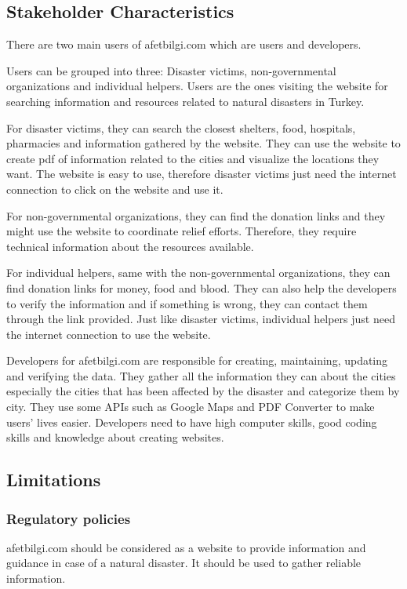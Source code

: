 \documentclass[12pt]{report}
\begin{document}
\subsection{Stakeholder Characteristics}
There are two main users of afetbilgi.com which are users and developers.

Users can be grouped into three: Disaster victims, non-governmental organizations and individual helpers. Users are the ones visiting the website for searching information and resources related to natural disasters in Turkey. 

For disaster victims, they can search the closest shelters, food, hospitals, pharmacies and information gathered by the website. They can use the website to create pdf of information related to the cities and visualize the locations they want. The website is easy to use, therefore disaster victims just need the internet connection to click on the website and use it.

For non-governmental organizations, they can find the donation links and they might use the website to coordinate relief efforts. Therefore, they require technical information about the resources available.

For individual helpers, same with the non-governmental organizations, they can find donation links for money, food and blood. They can also help the developers to verify the information and if something is wrong, they can contact them through the link provided. Just like disaster victims, individual helpers just need the internet connection to use the website.

Developers for afetbilgi.com are responsible for creating, maintaining, updating and verifying the data. They gather all the information they can about the cities especially the cities that has been affected by the disaster and categorize them by city. They use some APIs such as Google Maps and PDF Converter to make users’ lives easier. Developers need to have high computer skills, good coding skills and knowledge about creating websites.

\subsection{Limitations}
\subsubsection{Regulatory policies}
afetbilgi.com should be considered as a website to provide information and guidance in case of a natural disaster. It should be used to gather reliable information.
\end{document}
